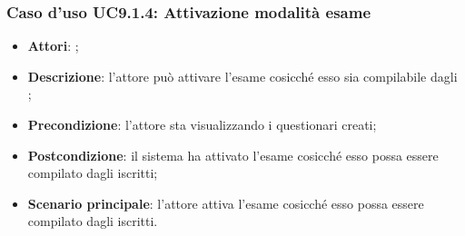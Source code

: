 		\subsubsection{Caso d'uso UC9.1.4: Attivazione modalità esame}
		\label{UC9.1.4}
		\begin{itemize}
			\item \textbf{Attori}: \uaupro{};
			\item \textbf{Descrizione}: l'attore può attivare l'esame cosicché esso sia compilabile dagli \uau{};
			\item \textbf{Precondizione}: l'attore sta visualizzando i questionari creati;
			\item \textbf{Postcondizione}: il sistema ha attivato l'esame cosicché esso possa essere compilato dagli \uaus{} iscritti;
			\item \textbf{Scenario principale}: l'attore attiva l'esame cosicché esso possa essere compilato dagli \uaus{} iscritti.
		\end{itemize}
										
